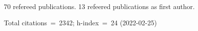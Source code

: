 70 refereed publications. 13 refeered publications as first author.

Total citations~=~2342; h-index~=~24 (2022-02-25)